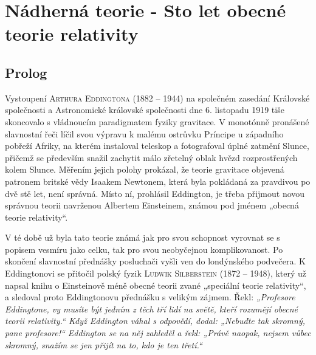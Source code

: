 \setchaptertoc
\chapter{Nádherná teorie - Sto let obecné teorie relativity}\label{feyIchIII}
\section{Prolog}\label{feyIchIIIsecI}

  Vystoupení \textsc{Arthura Eddingtona} (1882 – 1944) na společném zasedání Královské společnosti a
  Astronomické královské společnosti dne 6. listopadu 1919 tiše skoncovalo s vládnoucím paradigmatem
  fyziky gravitace. V monotónně pronášené slavnostní řeči líčil svou výpravu k malému ostrůvku
  Príncipe u západního pobřeží Afriky, na kterém instaloval teleskop a fotografoval úplné zatmění
  Slunce, přičemž se především snažil zachytit málo zřetelný oblak hvězd rozprostřených kolem
  Slunce. Měřením jejich polohy prokázal, že teorie gravitace objevená patronem britské vědy Isaakem
  Newtonem, která byla pokládaná za pravdivou po dvě stě let, není správná. Místo ní, prohlásil
  Eddington, je třeba přijmout novou správnou teorii navrženou Albertem Einsteinem, známou pod
  jménem „obecná teorie relativity“. 

  V té době už byla tato teorie známá jak pro svou schopnost vyrovnat se s popisem vesmíru jako
  celku, tak pro svou neobyčejnou komplikovanost. Po skončení slavnostní přednášky posluchači vyšli
  ven do londýnského podvečera. K Eddingtonovi se přitočil polský fyzik \textsc{Ludwik Silberstein}
  (1872 – 1948), který už napsal knihu o Einsteinově méně obecné teorii zvané „speciální teorie
  relativity“, a sledoval proto Eddingtonovu přednášku s velikým zájmem. Řekl: \emph{„Profesore
  Eddingtone, vy musíte být jedním z těch tří lidí na světě, kteří rozumějí obecné teorii
  relativity.“ Když Eddington váhal s odpovědí, dodal: „Nebuďte tak skromný, pane profesore!“
  Eddington se na něj zahleděl a řekl: „Právě naopak, nejsem vůbec skromný, snažím se jen přijít na
  to, kdo je ten třetí.“} 


